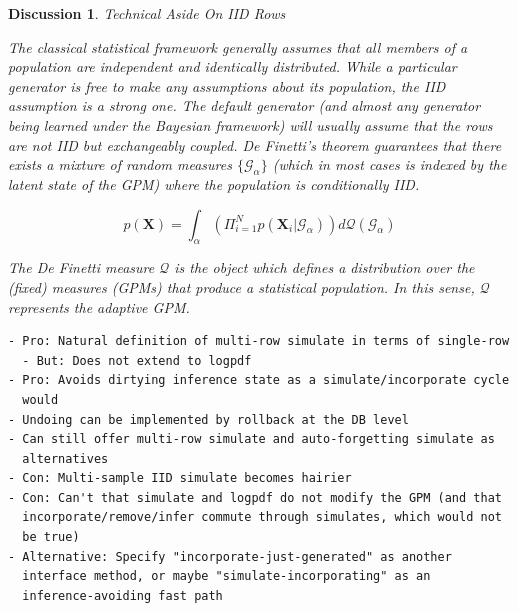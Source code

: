 \documentclass[10pt,letterpaper]{article}
\newtheorem{discussion}{Discussion}[section]
\newcommand{\set}[1]{\{#1\}}
\newcommand{\G}{\mathcal{G}}
\begin{document}

\begin{discussion} \label{disc:iid} Technical Aside On IID Rows

The classical statistical framework generally assumes that all members of a
population are independent and identically distributed. While a particular
generator is free to make any assumptions about its population, the IID
assumption is a strong one. The default generator (and almost any generator
being learned under the Bayesian framework) will usually assume that the rows
are not IID but exchangeably coupled. De Finetti's theorem guarantees that there
exists a mixture of random measures $\set{\G_\alpha}$ (which in most
cases is indexed by the latent state of the GPM) where the population is
conditionally IID.

$$p(\mathbf{X}) = \int_\alpha{(\Pi_{i=1}^Np(\mathbf{X}_i|\G_\alpha))d
\mathcal{Q}(\G_\alpha)}$$

The De Finetti measure $\mathcal{Q}$ is the object which defines a distribution
over the (fixed) measures (GPMs) that produce a statistical population. In this
sense, $\mathcal{Q}$ represents the adaptive GPM.

\end{discussion}

\begin{verbatim}
- Pro: Natural definition of multi-row simulate in terms of single-row
  - But: Does not extend to logpdf
- Pro: Avoids dirtying inference state as a simulate/incorporate cycle
  would
- Undoing can be implemented by rollback at the DB level
- Can still offer multi-row simulate and auto-forgetting simulate as
  alternatives
- Con: Multi-sample IID simulate becomes hairier
- Con: Can't that simulate and logpdf do not modify the GPM (and that
  incorporate/remove/infer commute through simulates, which would not
  be true)
- Alternative: Specify "incorporate-just-generated" as another
  interface method, or maybe "simulate-incorporating" as an
  inference-avoiding fast path
\end{verbatim}
\end{document}
